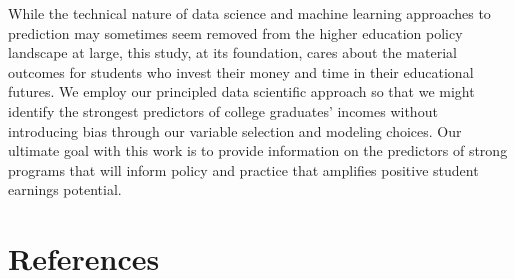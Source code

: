 While the technical nature of data science and machine learning
approaches to prediction may sometimes seem removed from the higher
education policy landscape at large, this study, at its foundation,
cares about the material outcomes for students who invest their money
and time in their educational futures. We employ our principled data
scientific approach so that we might identify the strongest predictors
of college graduates' incomes without introducing bias through our
variable selection and modeling choices. Our ultimate goal with this
work is to provide information on the predictors of strong programs that
will inform policy and practice that amplifies positive student earnings
potential.

\hypertarget{references}{%
\section{References}\label{references}}
